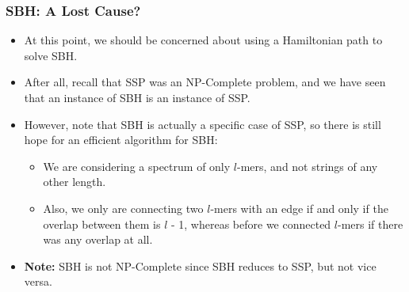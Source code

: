\documentclass[10pt]{article}
\begin{document}
\subsubsection*{SBH: A Lost Cause?}
\begin{itemize}
    \item At this point, we should be concerned about using a Hamiltonian path to solve SBH.
    \item After all, recall that SSP was an NP-Complete problem, and we have seen that an instance of SBH is an instance of SSP.
    \item However, note that SBH is actually a specific case of SSP, so there is still hope for an efficient algorithm for SBH:
    \begin{itemize}
        \item We are considering a spectrum of only $l$-mers, and not strings of any other length.
        \item Also, we only are connecting two $l$-mers with an edge if and only if the overlap between them is $l$ - 1, whereas before we connected $l$-mers if there was any overlap at all.
    \end{itemize}
    \item \textbf{Note:} SBH is not NP-Complete since SBH reduces to SSP, but not vice versa.
\end{itemize}
\end{document}
